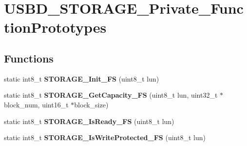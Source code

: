 \hypertarget{group___u_s_b_d___s_t_o_r_a_g_e___private___function_prototypes}{}\section{U\+S\+B\+D\+\_\+\+S\+T\+O\+R\+A\+G\+E\+\_\+\+Private\+\_\+\+Function\+Prototypes}
\label{group___u_s_b_d___s_t_o_r_a_g_e___private___function_prototypes}
\subsection*{Functions}
\begin{DoxyCompactItemize}
\item 
\mbox{\label{group___u_s_b_d___s_t_o_r_a_g_e___private___function_prototypes_ga0888a9b2906b148e1a030fcb110e65f4}} 
static int8\+\_\+t {\bfseries S\+T\+O\+R\+A\+G\+E\+\_\+\+Init\+\_\+\+FS} (uint8\+\_\+t lun)
\item 
\mbox{\label{group___u_s_b_d___s_t_o_r_a_g_e___private___function_prototypes_ga8b476566f5297e7c5409cb12a4f64d28}} 
static int8\+\_\+t {\bfseries S\+T\+O\+R\+A\+G\+E\+\_\+\+Get\+Capacity\+\_\+\+FS} (uint8\+\_\+t lun, uint32\+\_\+t $\ast$block\+\_\+num, uint16\+\_\+t $\ast$block\+\_\+size)
\item 
\mbox{\label{group___u_s_b_d___s_t_o_r_a_g_e___private___function_prototypes_gac4996ce4fab03f0a615f98f115290dd6}} 
static int8\+\_\+t {\bfseries S\+T\+O\+R\+A\+G\+E\+\_\+\+Is\+Ready\+\_\+\+FS} (uint8\+\_\+t lun)
\item 
\mbox{\label{group___u_s_b_d___s_t_o_r_a_g_e___private___function_prototypes_gae40a1e392b120db807d1d29c839050e1}} 
static int8\+\_\+t {\bfseries S\+T\+O\+R\+A\+G\+E\+\_\+\+Is\+Write\+Protected\+\_\+\+FS} (uint8\+\_\+t lun)
\item 
\mbox{\label{group___u_s_b_d___s_t_o_r_a_g_e___private___function_prototypes_ga553c05807b28f98260e86e77fa2b8c0b}} 

\end{DoxyCompactItemize}
